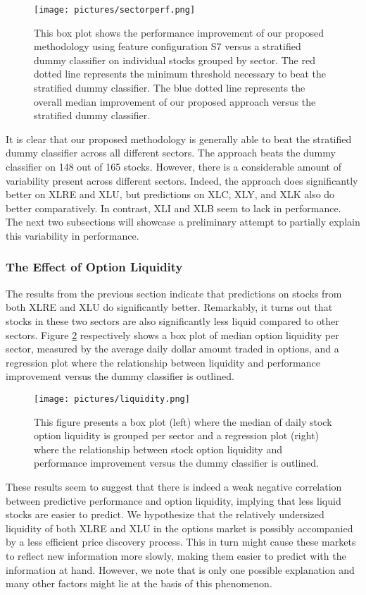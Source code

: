 \documentclass[preprint,1p, times,authoryear]{elsarticle}
\begin{document}
\begin{figure}[ht!]
\centering
\texttt{[image: pictures/sectorperf.png]}
\caption{This box plot shows the performance improvement of our proposed methodology using feature configuration S7 versus a stratified dummy classifier on individual stocks grouped by sector. The red dotted line represents the minimum threshold necessary to beat the stratified dummy classifier. The blue dotted line represents the overall median improvement of our proposed approach versus the stratified dummy classifier.}
\label{fig:secperf}
\end{figure}

It is clear that our proposed methodology is generally able to beat the stratified dummy classifier across all different sectors. The approach beats the dummy classifier on 148 out of 165 stocks. However, there is a considerable amount of variability present across different sectors. Indeed, the approach does significantly better on XLRE and XLU, but predictions on XLC, XLY, and XLK also do better comparatively. In contrast, XLI and XLB seem to lack in performance. The next two subsections will showcase a preliminary attempt to partially explain this variability in performance.


\subsubsection{The Effect of Option Liquidity}
The results from the previous section indicate that predictions on stocks from both XLRE and XLU do significantly better. Remarkably, it turns out that stocks in these two sectors are also significantly less liquid compared to other sectors. Figure \ref{fig:secliq} respectively shows a box plot of median option liquidity per sector, measured by the average daily dollar amount traded in options, and a regression plot where the relationship between liquidity and performance improvement versus the dummy classifier is outlined. 

\begin{figure}[ht!]
\centering
\texttt{[image: pictures/liquidity.png]}
\caption{This figure presents a box plot (left) where the median of daily stock option liquidity is grouped per sector and a regression plot (right) where the relationship between stock option liquidity and performance improvement versus the dummy classifier is outlined.}
\label{fig:secliq}
\end{figure}

These results seem to suggest that there is indeed a weak negative correlation between predictive performance and option liquidity, implying that less liquid stocks are easier to predict. 
We hypothesize that the relatively undersized liquidity of both XLRE and XLU in the options market is possibly accompanied by a less efficient price discovery process. This in turn might cause these markets to reflect new information more slowly, making them easier to predict with the information at hand. However, we note that is only one possible explanation and many other factors might lie at the basis of this phenomenon. 
\end{document}
